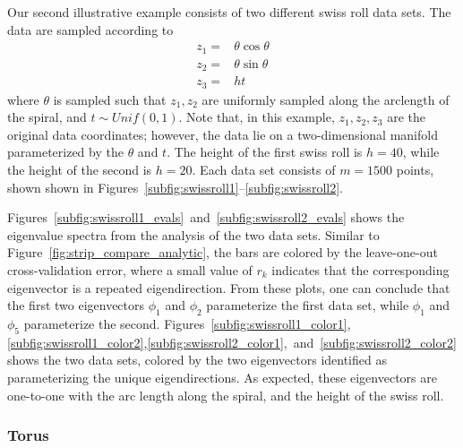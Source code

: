 \documentclass[3p]{elsarticle}
\begin{document}
Our second illustrative example consists of two different swiss roll data sets.
%
The data are sampled according to
\begin{equation}
\begin{aligned}
z_1 =& \theta \cos \theta \\
z_2 =& \theta \sin \theta \\
z_3 =& h t
\end{aligned}
\end{equation}
%
where $\theta$ is sampled such that $z_1, z_2$ are uniformly sampled along the arclength of the spiral, and $t \sim Unif(0,1)$. 
%
Note that, in this example, $z_1, z_2, z_3$ are the original data coordinates; however, the data lie on a two-dimensional manifold parameterized by the $\theta$ and $t$. 
%
The height of the first swiss roll is $h = 40$, while the height of the second is $h = 20$. 
%
Each data set consists of $m=1500$ points, shown shown in Figures~\ref{subfig:swissroll1}--\ref{subfig:swissroll2}.
%

Figures~\ref{subfig:swissroll1_evals}~and~\ref{subfig:swissroll2_evals} shows the eigenvalue spectra from the analysis of the two data sets.
%
Similar to Figure~\ref{fig:strip_compare_analytic}, the bars are colored by the leave-one-out cross-validation error, where a small value of $r_k$ indicates that the corresponding eigenvector is a repeated eigendirection. 
%
From these plots, one can conclude that the first two eigenvectors $\phi_1$ and $\phi_2$ parameterize the first data set, while $\phi_1$ and $\phi_5$ parameterize the second. 
%
Figures~\ref{subfig:swissroll1_color1},\ref{subfig:swissroll1_color2},\ref{subfig:swissroll2_color1},~and~\ref{subfig:swissroll2_color2} shows the two data sets, colored by the two eigenvectors identified as parameterizing the unique eigendirections. 
%
As expected, these eigenvectors are one-to-one with the arc length along the spiral, and the height of the swiss roll. 

\subsubsection{Torus}
\end{document}
